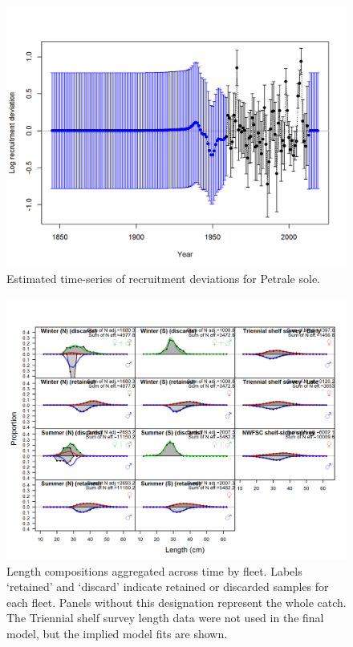 \documentclass[12pt,]{article}
\begin{document}
\FloatBarrier

\begin{figure}
\centering
\includegraphics{r4ss/plots_mod1/recdevs2_withbars.png}
\caption{Estimated time-series of recruitment deviations for Petrale
sole. \label{fig:recdevs}}
\end{figure}

\FloatBarrier

\begin{figure}
\centering
\includegraphics{r4ss/plots_mod1/comp_lenfit__aggregated_across_time.png}
\caption{Length compositions aggregated across time by fleet. Labels
`retained' and `discard' indicate retained or discarded samples for each
fleet. Panels without this designation represent the whole catch. The
Triennial shelf survey length data were not used in the final model, but
the implied model fits are shown. \label{fig:length_agg}}
\end{figure}
\end{document}
